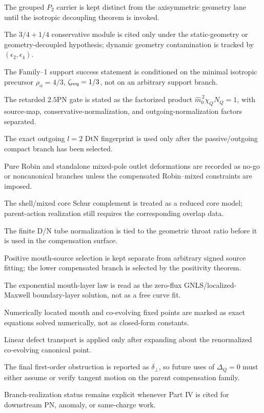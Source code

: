 \begin{verificationchecklist}
\item The grouped \(P_2\) carrier is kept distinct from the axisymmetric geometry lane until the isotropic decoupling theorem is invoked.
\item The \(3/4+1/4\) conservative module is cited only under the static-geometry or geometry-decoupled hypothesis; dynamic geometry contamination is tracked by \((\epsilon_2,\epsilon_4)\).
\item The Family--1 support success statement is conditioned on the minimal isotropic precursor \(\rho_\alpha=4/3\), \(\zeta_{\rm req}=1/3\), not on an arbitrary support branch.
\item The retarded \(2.5\)PN gate is stated as the factorized product \(\widehat m_0^{\,2}\chi_QN_Q=1\), with source-map, conservative-normalization, and outgoing-normalization factors separated.
\item The exact outgoing \(l=2\) DtN fingerprint is used only after the passive/outgoing compact branch has been selected.
\item Pure Robin and standalone mixed-pole outlet deformations are recorded as no-go or noncanonical branches unless the compensated Robin--mixed constraints are imposed.
\item The shell/mixed core Schur complement is treated as a reduced core model; parent-action realization still requires the corresponding overlap data.
\item The finite D/N tube normalization is tied to the geometric throat ratio before it is used in the compensation surface.
\item Positive mouth-source selection is kept separate from arbitrary signed source fitting; the lower compensated branch is selected by the positivity theorem.
\item The exponential mouth-layer law is read as the zero-flux GNLS/localized-Maxwell boundary-layer solution, not as a free curve fit.
\item Numerically located mouth and co-evolving fixed points are marked as exact equations solved numerically, not as closed-form constants.
\item Linear defect transport is applied only after expanding about the renormalized co-evolving canonical point.
\item The final first-order obstruction is reported as \(\delta_\perp\), so future uses of \(\Delta_Q=0\) must either assume or verify tangent motion on the parent compensation family.
\item Branch-realization status remains explicit whenever Part IV is cited for downstream PN, anomaly, or same-charge work.
\end{verificationchecklist}

